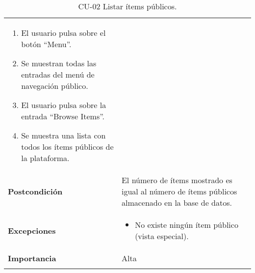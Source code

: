 \begin{longtable}[]{@{}ll@{}}
\begin{minipage}[t]{0.74\columnwidth}
\begin{enumerate}
\def\labelenumi{\arabic{enumi}.}
\tightlist
\item
  El usuario pulsa sobre el botón ``Menu''.
\item
  Se muestran todas las entradas del menú de navegación público.
\item
  El usuario pulsa sobre la entrada ``Browse Items''.
\item
  Se muestra una lista con todos los ítems públicos de la plataforma.
\end{enumerate}\strut
\end{minipage}\tabularnewline
\begin{minipage}[t]{0.20\columnwidth}\raggedright
\textbf{Postcondición}\strut
\end{minipage} & \begin{minipage}[t]{0.74\columnwidth}\raggedright
El número de ítems mostrado es igual al número de ítems públicos
almacenado en la base de datos.\strut
\end{minipage}\tabularnewline
\begin{minipage}[t]{0.20\columnwidth}\raggedright
\textbf{Excepciones}\strut
\end{minipage} & \begin{minipage}[t]{0.74\columnwidth}\raggedright
\begin{itemize}
\tightlist
\item
  No existe ningún ítem público (vista especial).
\end{itemize}\strut
\end{minipage}\tabularnewline
\begin{minipage}[t]{0.20\columnwidth}\raggedright
\textbf{Importancia}\strut
\end{minipage} & \begin{minipage}[t]{0.74\columnwidth}\raggedright
Alta\strut
\end{minipage}\tabularnewline
\bottomrule
\caption{CU-02 Listar ítems públicos.}
\end{longtable}

